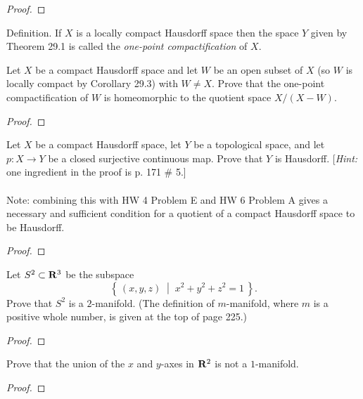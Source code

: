 \begin{proof}
\end{proof}
\newpage
\begin{problem}[(A)]
\begin{definition}
Definition. If $X$ is a locally compact Hausdorff space then the
space $Y$ given by Theorem 29.1 is called the \emph{one-point
  compactification} of $X$.
\end{definition}

Let $X$ be a compact Hausdorff space and let $W$ be an open
subset of $X$ (so $W$ is locally compact by Corollary 29.3) with
$W\neq X$. Prove that the one-point compactification of $W$ is
homeomorphic to the quotient space $X/(X-W)$.
\end{problem}
\begin{proof}
\end{proof}
\newpage
\begin{problem}[(B)]
Let $X$ be a compact Hausdorff space, let $Y$ be a topological
space, and let $p\colon X\to Y$ be a closed surjective continuous
map. Prove that $Y$ is Hausdorff. [\emph{Hint:} one ingredient in the
proof is p. 171 \# 5.]
\\\\
Note: combining this with HW 4 Problem E and HW 6 Problem A gives
a necessary and sufficient condition for a quotient of a compact
Hausdorff space to be Hausdorff.
\end{problem}
\begin{proof}
\end{proof}
\newpage
\begin{problem}[(C)]
Let $S^2\subset\mathbf{R}^3$ be the subspace
\[
\left\{\,(x,y,z)\;\middle|\; x^2+y^2+z^2=1\,\right\}.
\]
Prove that $S^2$ is a $2$-manifold. (The definition of
$m$-manifold, where $m$ is a positive whole number, is given at
the top of page 225.)
\end{problem}
\begin{proof}
\end{proof}
\newpage
\begin{problem}[(D)]
Prove that the union of the $x$ and $y$-axes in $\mathbf{R}^2$ is not a
$1$-manifold.
\end{problem}
\begin{proof}
\end{proof}

